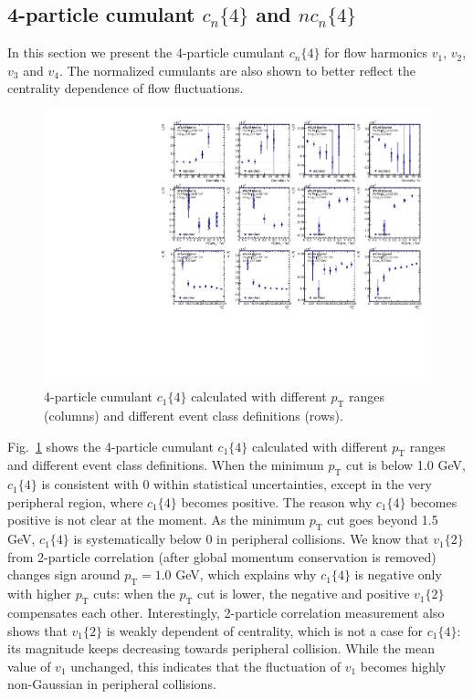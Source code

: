 \subsection{4-particle cumulant $c_n\{4\}$ and $nc_n\{4\}$}
In this section we present the 4-particle cumulant $c_n\{4\}$ for flow harmonics $v_1$, $v_2$, $v_3$ and $v_4$. The normalized cumulants are also shown to better reflect the centrality dependence of flow fluctuations.
\begin{figure}[H]
\centering
\includegraphics[width=.95\linewidth]{figs/sec_result/forQM/phy_c4_Har1.pdf}
\caption{4-particle cumulant $c_1\{4\}$ calculated with different $p_\text{T}$ ranges (columns) and different event class definitions (rows).}
\label{fig:result_phy_c4_Har1}
\end{figure}
Fig.~\ref{fig:result_phy_c4_Har1} shows the 4-particle cumulant $c_1\{4\}$ calculated with different $p_\text{T}$ ranges and different event class definitions. When the minimum $p_\text{T}$ cut is below 1.0 GeV, $c_1\{4\}$ is consistent with 0 within statistical uncertainties, except in the very peripheral region, where $c_1\{4\}$ becomes positive. The reason why $c_1\{4\}$ becomes positive is not clear at the moment. As the minimum $p_\text{T}$ cut goes beyond 1.5 GeV, $c_1\{4\}$ is systematically below 0 in peripheral collisions. We know that $v_1\{2\}$ from 2-particle correlation (after global momentum conservation is removed) changes sign around $p_\text{T}=1.0$ GeV, which explains why $c_1\{4\}$ is negative only with higher $p_\text{T}$ cuts: when the $p_\text{T}$ cut is lower, the negative and positive $v_1\{2\}$ compensates each other. Interestingly, 2-particle correlation measurement also shows that $v_1\{2\}$ is weakly dependent of centrality, which is not a case for $c_1\{4\}$: its magnitude keeps decreasing towards peripheral collision. While the mean value of $v_1$ unchanged, this indicates that the fluctuation of $v_1$ becomes highly non-Gaussian in peripheral collisions.

